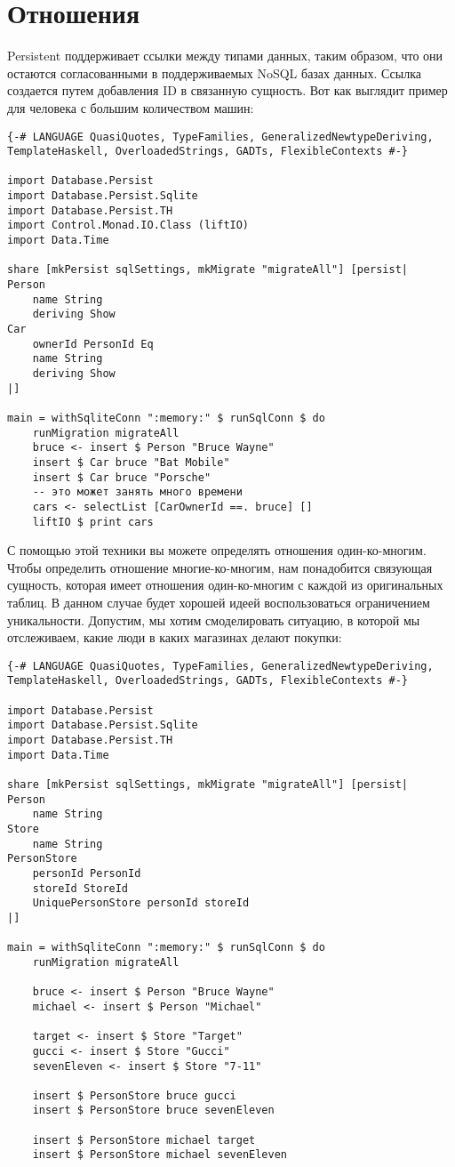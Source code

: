 \section{Отношения} %

Persistent поддерживает ссылки между типами данных, таким образом, что они остаются согласованными в поддерживаемых NoSQL базах данных. Ссылка создается путем добавления ID в связанную сущность. Вот как выглядит пример для человека с большим количеством машин:

\begin{lstlisting}
{-# LANGUAGE QuasiQuotes, TypeFamilies, GeneralizedNewtypeDeriving, TemplateHaskell, OverloadedStrings, GADTs, FlexibleContexts #-}

import Database.Persist
import Database.Persist.Sqlite
import Database.Persist.TH
import Control.Monad.IO.Class (liftIO)
import Data.Time

share [mkPersist sqlSettings, mkMigrate "migrateAll"] [persist|
Person
    name String
    deriving Show
Car
    ownerId PersonId Eq
    name String
    deriving Show
|]

main = withSqliteConn ":memory:" $ runSqlConn $ do
    runMigration migrateAll
    bruce <- insert $ Person "Bruce Wayne"
    insert $ Car bruce "Bat Mobile"
    insert $ Car bruce "Porsche"
    -- это может занять много времени
    cars <- selectList [CarOwnerId ==. bruce] []
    liftIO $ print cars
\end{lstlisting}%

С помощью этой техники вы можете определять отношения один-ко-многим. Чтобы определить отношение многие-ко-многим, нам понадобится связующая сущность, которая имеет отношения один-ко-многим с каждой из оригинальных таблиц. В данном случае будет хорошей идеей воспользоваться ограничением уникальности. Допустим, мы хотим смоделировать ситуацию, в которой мы отслеживаем, какие люди в каких магазинах делают покупки:

\begin{lstlisting}
{-# LANGUAGE QuasiQuotes, TypeFamilies, GeneralizedNewtypeDeriving, TemplateHaskell, OverloadedStrings, GADTs, FlexibleContexts #-}

import Database.Persist
import Database.Persist.Sqlite
import Database.Persist.TH
import Data.Time

share [mkPersist sqlSettings, mkMigrate "migrateAll"] [persist|
Person
    name String
Store
    name String
PersonStore
    personId PersonId
    storeId StoreId
    UniquePersonStore personId storeId
|]

main = withSqliteConn ":memory:" $ runSqlConn $ do
    runMigration migrateAll

    bruce <- insert $ Person "Bruce Wayne"
    michael <- insert $ Person "Michael"

    target <- insert $ Store "Target"
    gucci <- insert $ Store "Gucci"
    sevenEleven <- insert $ Store "7-11"

    insert $ PersonStore bruce gucci
    insert $ PersonStore bruce sevenEleven

    insert $ PersonStore michael target
    insert $ PersonStore michael sevenEleven
\end{lstlisting}%

